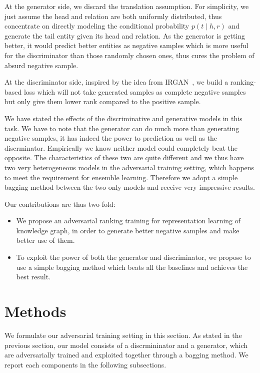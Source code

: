 \documentclass[twocolumn,a4paper,10pt,review,5p]{elsarticle}
\begin{document}
At the generator side, we discard the translation assumption. For simplicity, we just assume the head and relation are both uniformly distributed, thus concentrate on directly modeling the conditional probability $p(t\mid h, r)$ and generate the tail entity given its head and relation. As the generator is getting better, it would predict better entities as negative samples which is more useful for the discriminator than those randomly chosen ones, thus cures the problem of absurd negative sample.

At the discriminator side, inspired by the idea from IRGAN~\cite{IRGAN}, we build a ranking-based loss which will not take generated samples as complete negative samples but only give them lower rank compared to the positive sample.

We have stated the effects of the discriminative and generative models in this task. We have to note that the generator can do much more than generating negative samples, it has indeed the power to prediction as well as the discrminator. Empirically we know neither model could completely beat the opposite. The characteristics of these two are quite different and we thus have two very heterogeneous models in the adversarial training setting, which happens to meet the requirement for ensemble learning. Therefore we adopt a simple bagging method between the two only models and receive very impressive results.

Our contributions are thus two-fold:
\begin{itemize}
    \item We propose an adversarial ranking training for representation learning of knowledge graph, in order to generate better negative samples and make better use of them.
    \item To exploit the power of both the generator and discriminator, we propose to use a simple bagging method which beats all the baselines and achieves the best result.
\end{itemize}



\section{Methods}

We formulate our adversarial training setting in this section. As stated in the previous section, our model consists of a discrmininator and a generator, which are adversarially trained and exploited together through a bagging method. We report each components in the following subsections.
\end{document}
